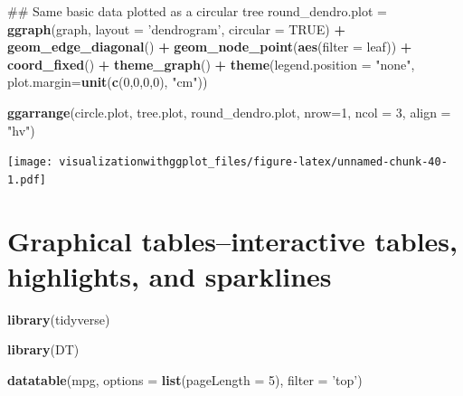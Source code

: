 \documentclass[]{krantz}
\makeatletter
\newenvironment{Shaded}{\begin{snugshade}}{\end{snugshade}}
\newcommand{\KeywordTok}[1]{\textcolor[rgb]{0.13,0.29,0.53}{\textbf{#1}}}
\newcommand{\DataTypeTok}[1]{\textcolor[rgb]{0.13,0.29,0.53}{#1}}
\newcommand{\DecValTok}[1]{\textcolor[rgb]{0.00,0.00,0.81}{#1}}
\newcommand{\StringTok}[1]{\textcolor[rgb]{0.31,0.60,0.02}{#1}}
\newcommand{\OtherTok}[1]{\textcolor[rgb]{0.56,0.35,0.01}{#1}}
\newcommand{\OperatorTok}[1]{\textcolor[rgb]{0.81,0.36,0.00}{\textbf{#1}}}
\newcommand{\NormalTok}[1]{#1}
\newenvironment{kframe}{%
\medskip{}
\setlength{\fboxsep}{.8em}
 \def\at@end@of@kframe{}%
 \ifinner\ifhmode%
  \def\at@end@of@kframe{\end{minipage}}%
  \begin{minipage}{\columnwidth}%
 \fi\fi%
 \def\FrameCommand##1{\hskip\@totalleftmargin \hskip-\fboxsep
 \colorbox{shadecolor}{##1}\hskip-\fboxsep
     \hskip-\linewidth \hskip-\@totalleftmargin \hskip\columnwidth}%
 \MakeFramed {\advance\hsize-\width
   \@totalleftmargin\z@ \linewidth\hsize
   \@setminipage}}%
 {\par\unskip\endMakeFramed%
 \at@end@of@kframe}
\renewenvironment{Shaded}{\begin{kframe}}{\end{kframe}}
\theoremstyle{definition}
\theoremstyle{definition}
\theoremstyle{definition}
\theoremstyle{remark}
\makeatother
\begin{document}
\begin{Shaded}
\begin{Highlighting}[]
\NormalTok{## Same basic data plotted as a circular tree}
\NormalTok{round_dendro.plot =}\StringTok{ }\KeywordTok{ggraph}\NormalTok{(graph, }\DataTypeTok{layout =} \StringTok{'dendrogram'}\NormalTok{, }\DataTypeTok{circular =} \OtherTok{TRUE}\NormalTok{) }\OperatorTok{+}\StringTok{ }
\StringTok{    }\KeywordTok{geom_edge_diagonal}\NormalTok{() }\OperatorTok{+}\StringTok{ }
\StringTok{    }\KeywordTok{geom_node_point}\NormalTok{(}\KeywordTok{aes}\NormalTok{(}\DataTypeTok{filter =}\NormalTok{ leaf)) }\OperatorTok{+}\StringTok{ }
\StringTok{    }\KeywordTok{coord_fixed}\NormalTok{() }\OperatorTok{+}
\StringTok{    }\KeywordTok{theme_graph}\NormalTok{() }\OperatorTok{+}\StringTok{ }
\StringTok{  }\KeywordTok{theme}\NormalTok{(}\DataTypeTok{legend.position =} \StringTok{"none"}\NormalTok{, }\DataTypeTok{plot.margin=}\KeywordTok{unit}\NormalTok{(}\KeywordTok{c}\NormalTok{(}\DecValTok{0}\NormalTok{,}\DecValTok{0}\NormalTok{,}\DecValTok{0}\NormalTok{,}\DecValTok{0}\NormalTok{), }\StringTok{"cm"}\NormalTok{))}


\KeywordTok{ggarrange}\NormalTok{(circle.plot, tree.plot, round_dendro.plot,}
\DataTypeTok{nrow=}\DecValTok{1}\NormalTok{, }\DataTypeTok{ncol =} \DecValTok{3}\NormalTok{, }\DataTypeTok{align =} \StringTok{"hv"}\NormalTok{)}
\end{Highlighting}
\end{Shaded}

\texttt{[image: visualizationwithggplot\_files/figure-latex/unnamed-chunk-40-1.pdf]}

\cleardoublepage 

\chapter{Graphical tables--interactive tables, highlights, and
sparklines}\label{Tables}

\begin{Shaded}
\begin{Highlighting}[]
\KeywordTok{library}\NormalTok{(tidyverse)}
\end{Highlighting}
\end{Shaded}

\begin{Shaded}
\begin{Highlighting}[]
\KeywordTok{library}\NormalTok{(DT)}

\KeywordTok{datatable}\NormalTok{(mpg, }\DataTypeTok{options =} \KeywordTok{list}\NormalTok{(}\DataTypeTok{pageLength =} \DecValTok{5}\NormalTok{), }\DataTypeTok{filter =} \StringTok{'top'}\NormalTok{)}
\end{Highlighting}
\end{Shaded}
\end{document}
